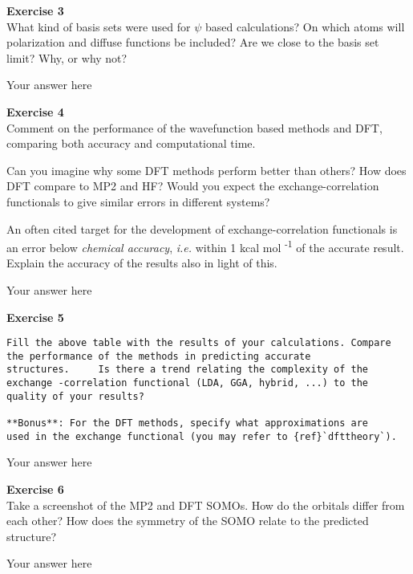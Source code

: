 \documentclass{article}
\begin{document}
\begin{mdframed}
\textbf{Exercise 3}\\
What kind of basis sets were used for $\psi$ based calculations? On which atoms will polarization and diffuse functions be included? Are we close to the basis set limit? Why, or why not?
\end{mdframed}

Your answer here

\begin{mdframed}
\textbf{Exercise 4}\\
Comment on the performance of the wavefunction based methods and DFT, comparing both accuracy and computational time.

Can you imagine why some DFT methods perform better than others? How does DFT compare to MP2 and HF?
Would you expect the exchange-correlation functionals to give similar errors in different systems?

An often cited target for the development of exchange-correlation functionals is an error below \textit{chemical accuracy}, \textit{i.e.} within 1
kcal mol \textsuperscript{-1} of the accurate result. Explain the accuracy of the results also in light of this.
\end{mdframed}

Your answer here

\begin{mdframed}
\textbf{Exercise 5}\\
\begin{verbatim}
Fill the above table with the results of your calculations. Compare the performance of the methods in predicting accurate
structures.     Is there a trend relating the complexity of the exchange -correlation functional (LDA, GGA, hybrid, ...) to the quality of your results?

**Bonus**: For the DFT methods, specify what approximations are
used in the exchange functional (you may refer to {ref}`dfttheory`).
\end{verbatim}
\end{mdframed}

Your answer here

\begin{mdframed}
\textbf{Exercise 6}\\
Take a screenshot of the MP2 and DFT SOMOs. How do the orbitals differ from each other? How does the symmetry of the SOMO relate to the predicted structure?
\end{mdframed}

Your answer here
\end{document}
